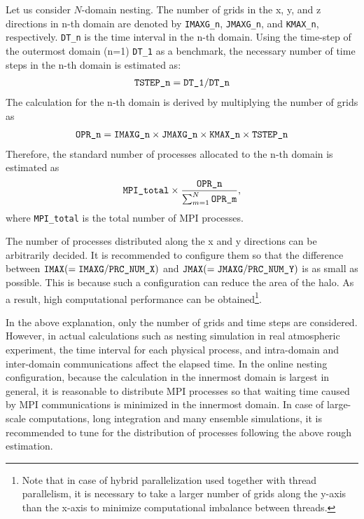 Let us consider $N$-domain nesting. The number of grids in the x, y, and z directions in n-th domain are denoted by
\verb|IMAXG_n|, \verb|JMAXG_n|, and \verb|KMAX_n|, respectively.
\verb|DT_n| is the time interval  in the n-th domain.
Using the time-step of the outermost domain (n=1) \verb|DT_1| as a benchmark,
the necessary number of time steps in the n-th domain is estimated as:
\begin{eqnarray}
 \verb|TSTEP_n| = \verb|DT_1| / \verb|DT_n|  \nonumber
\end{eqnarray}
The calculation for the n-th domain is derived by multiplying the number of grids as
\begin{eqnarray}
 \verb|OPR_n| = \verb|IMAXG_n| \times \verb|JMAXG_n| \times \verb|KMAX_n| \times \verb|TSTEP_n| \nonumber
\end{eqnarray}
Therefore, the standard number of processes allocated to the n-th domain is estimated as
\begin{eqnarray}
 \verb|MPI_total| \times \frac{ \texttt{OPR\_n} }{ \sum_{m=1}^N \texttt{OPR\_m} },
\end{eqnarray}
where \verb|MPI_total| is the total number of MPI processes.

The number of processes distributed along the x and y directions  can be arbitrarily decided.
It is recommended to configure them so that the difference between $\nmitemeq{IMAX}(=\nmitemeq{IMAXG}/\nmitemeq{PRC_NUM_X})$ and $\nmitemeq{JMAX}(=\nmitemeq{JMAXG}/\nmitemeq{PRC_NUM_Y})$ is as small as possible.
This is because such a configuration can reduce the area of the halo.
As a result, high computational performance can be obtained\footnote{Note that in case of hybrid parallelization used together with thread parallelism, it is necessary to take a larger number of grids along the y-axis than the x-axis to minimize computational imbalance between threads.}.


In the above explanation, only the number of grids and time steps are considered. However, in actual calculations such as nesting simulation in real atmospheric experiment, the time interval for each physical process, and intra-domain and inter-domain communications affect the elapsed time. In the online nesting configuration, because the calculation in the innermost domain is largest in general, it is reasonable to distribute MPI processes so that waiting time caused by MPI communications is minimized in the innermost domain.  In case of large-scale computations, long integration and many ensemble simulations, it is recommended to tune for the distribution of processes following the above rough estimation.

